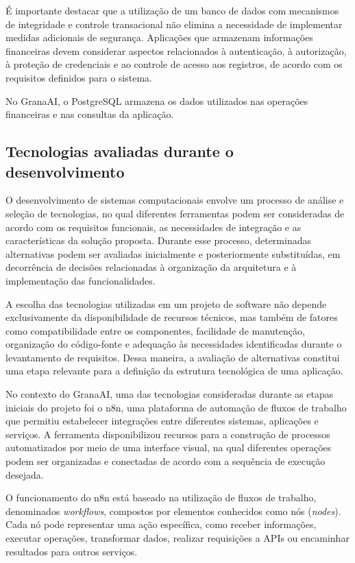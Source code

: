 É importante destacar que a utilização de um banco de dados com mecanismos de integridade e controle transacional não elimina a necessidade de implementar medidas adicionais de segurança. Aplicações que armazenam informações financeiras devem considerar aspectos relacionados à autenticação, à autorização, à proteção de credenciais e ao controle de acesso aos registros, de acordo com os requisitos definidos para o sistema.

No GranaAI, o PostgreSQL armazena os dados utilizados nas operações financeiras e nas consultas da aplicação.

\subsection{Tecnologias avaliadas durante o desenvolvimento}

O desenvolvimento de sistemas computacionais envolve um processo de análise e seleção de tecnologias, no qual diferentes ferramentas podem ser consideradas de acordo com os requisitos funcionais, as necessidades de integração e as características da solução proposta. Durante esse processo, determinadas alternativas podem ser avaliadas inicialmente e posteriormente substituídas, em decorrência de decisões relacionadas à organização da arquitetura e à implementação das funcionalidades.

A escolha das tecnologias utilizadas em um projeto de software não depende exclusivamente da disponibilidade de recursos técnicos, mas também de fatores como compatibilidade entre os componentes, facilidade de manutenção, organização do código-fonte e adequação às necessidades identificadas durante o levantamento de requisitos. Dessa maneira, a avaliação de alternativas constitui uma etapa relevante para a definição da estrutura tecnológica de uma aplicação.

No contexto do GranaAI, uma das tecnologias consideradas durante as etapas iniciais do projeto foi o n8n, uma plataforma de automação de fluxos de trabalho que permitiu estabelecer integrações entre diferentes sistemas, aplicações e serviços. A ferramenta disponibilizou recursos para a construção de processos automatizados por meio de uma interface visual, na qual diferentes operações podem ser organizadas e conectadas de acordo com a sequência de execução desejada.

O funcionamento do n8n está baseado na utilização de fluxos de trabalho, denominados \textit{workflows}, compostos por elementos conhecidos como nós (\textit{nodes}). Cada nó pode representar uma ação específica, como receber informações, executar operações, transformar dados, realizar requisições a APIs ou encaminhar resultados para outros serviços.

